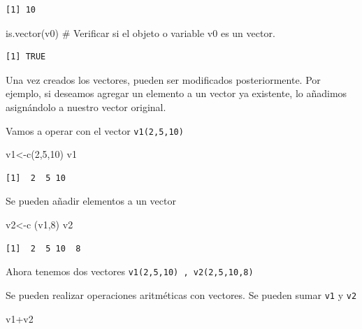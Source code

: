\documentclass[
  letterpaper,
  DIV=11,
  numbers=noendperiod]{scrreprt}
\newenvironment{Shaded}{\begin{snugshade}}{\end{snugshade}}
\newcommand{\CommentTok}[1]{\textcolor[rgb]{0.37,0.37,0.37}{#1}}
\newcommand{\DecValTok}[1]{\textcolor[rgb]{0.68,0.00,0.00}{#1}}
\newcommand{\FunctionTok}[1]{\textcolor[rgb]{0.28,0.35,0.67}{#1}}
\newcommand{\NormalTok}[1]{\textcolor[rgb]{0.00,0.23,0.31}{#1}}
\newcommand{\OtherTok}[1]{\textcolor[rgb]{0.00,0.23,0.31}{#1}}
\newcommand{\SpecialCharTok}[1]{\textcolor[rgb]{0.37,0.37,0.37}{#1}}
\begin{document}
\begin{verbatim}
[1] 10
\end{verbatim}

\begin{Shaded}
\begin{Highlighting}[]
\FunctionTok{is.vector}\NormalTok{(v0) }\CommentTok{\# Verificar si el objeto o variable \textquotesingle{}v0\textquotesingle{} es un vector.}
\end{Highlighting}
\end{Shaded}

\begin{verbatim}
[1] TRUE
\end{verbatim}

Una vez creados los vectores, pueden ser modificados posteriormente. Por
ejemplo, si deseamos agregar un elemento a un vector ya existente, lo
añadimos asignándolo a nuestro vector original.

Vamos a operar con el vector \texttt{v1(2,5,10)}

\begin{Shaded}
\begin{Highlighting}[]
\NormalTok{v1}\OtherTok{\textless{}{-}}\FunctionTok{c}\NormalTok{(}\DecValTok{2}\NormalTok{,}\DecValTok{5}\NormalTok{,}\DecValTok{10}\NormalTok{)}
\NormalTok{v1}
\end{Highlighting}
\end{Shaded}

\begin{verbatim}
[1]  2  5 10
\end{verbatim}

Se pueden añadir elementos a un vector

\begin{Shaded}
\begin{Highlighting}[]
\NormalTok{v2}\OtherTok{\textless{}{-}}\FunctionTok{c}\NormalTok{ (v1,}\DecValTok{8}\NormalTok{)}
\NormalTok{v2}
\end{Highlighting}
\end{Shaded}

\begin{verbatim}
[1]  2  5 10  8
\end{verbatim}

Ahora tenemos dos vectores \texttt{v1(2,5,10)\ ,\ v2(2,5,10,8)}

Se pueden realizar operaciones aritméticas con vectores. Se pueden sumar
\texttt{v1} y \texttt{v2}

\begin{Shaded}
\begin{Highlighting}[]
\NormalTok{v1}\SpecialCharTok{+}\NormalTok{v2}
\end{Highlighting}
\end{Shaded}
\end{document}

